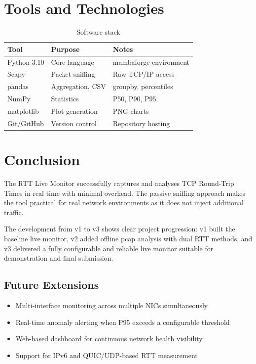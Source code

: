 \documentclass[12pt,a4paper]{article}
\begin{document}
\section{Tools and Technologies}

\begin{table}[H]
    \centering
    \caption{Software stack}
    \begin{tabular}{lll}
        \toprule
        \textbf{Tool} & \textbf{Purpose} & \textbf{Notes} \\
        \midrule
        Python 3.10 & Core language         & mambaforge environment \\
        Scapy       & Packet sniffing       & Raw TCP/IP access \\
        pandas      & Aggregation, CSV      & groupby, percentiles \\
        NumPy       & Statistics            & P50, P90, P95 \\
        matplotlib  & Plot generation       & PNG charts \\
        Git/GitHub  & Version control       & Repository hosting \\
        \bottomrule
    \end{tabular}
\end{table}

\section{Conclusion}

The RTT Live Monitor successfully captures and analyses TCP Round-Trip Times in
real time with minimal overhead. The passive sniffing approach makes the tool
practical for real network environments as it does not inject additional traffic.

The development from v1 to v3 shows clear project progression: v1 built the
baseline live monitor, v2 added offline pcap analysis with dual RTT methods,
and v3 delivered a fully configurable and reliable live monitor suitable for
demonstration and final submission.

\subsection*{Future Extensions}
\begin{itemize}[leftmargin=*]
    \item Multi-interface monitoring across multiple NICs simultaneously
    \item Real-time anomaly alerting when P95 exceeds a configurable threshold
    \item Web-based dashboard for continuous network health visibility
    \item Support for IPv6 and QUIC/UDP-based RTT measurement
\end{itemize}
\end{document}
